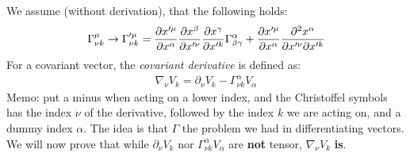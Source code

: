 \documentclass[../template.tex]{subfiles}
\begin{document}
We assume (without derivation), that the following holds:
\begin{align*}
    \Gamma^\mu_{\nu k} \to \Gamma'^\mu_{\nu k} = \pdv{x'^\mu}{x^\alpha} \pdv{x^\beta}{x'^\nu} \pdv{x^\gamma}{x'^k} \Gamma^\alpha_{\beta \gamma} + \pdv{x'^\mu}{x^\alpha} \pdv{x^\alpha}{x'^\nu}{x'^k}
\end{align*}
For a covariant vector, the \textit{covariant derivative} is defined as:
\begin{align*}
    \nabla_\nu V_k = \partial_\nu V_k - \Gamma^\alpha_{\nu k} V_\alpha
\end{align*} 
Memo: put a minus when acting on a lower index, and the Christoffel symbols has the index $\nu$ of the derivative, followed by the index $k$ we are acting on, and a dummy index $\alpha$. The idea is that $\Gamma$  the problem we had in differentiating vectors.\\
We will now prove that while $\partial_\nu V_k$ nor $\Gamma^\alpha_{\nu k} V_\alpha$ are \textbf{not} tensor, $\nabla_\nu V_k$ \textbf{is}.\\
\end{document}
